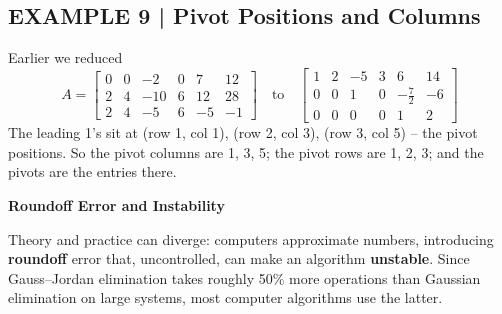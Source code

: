 \documentclass{article}
\newcommand{\redheading}[1]{{\vspace{2mm}\noindent\Large\bfseries\color{red!55!black} #1\par}\vspace{2mm}}
\theoremstyle{mystyle}
\begin{document}
\subsection*{EXAMPLE 9 | Pivot Positions and Columns}
Earlier we reduced
\[
A=\begin{bmatrix}0&0&-2&0&7&12\\2&4&-10&6&12&28\\2&4&-5&6&-5&-1\end{bmatrix}
\quad\text{to}\quad
\begin{bmatrix}1&2&-5&3&6&14\\0&0&1&0&-\tfrac72&-6\\0&0&0&0&1&2\end{bmatrix}
\]
The leading 1's sit at (row 1, col 1), (row 2, col 3), (row 3, col 5) -- the pivot positions. So the pivot columns are 1, 3, 5; the pivot rows are 1, 2, 3; and the pivots are the entries there.

\redheading{Roundoff Error and Instability}

Theory and practice can diverge: computers approximate numbers, introducing \textbf{roundoff} error that, uncontrolled, can make an algorithm \textbf{unstable}. Since Gauss--Jordan elimination takes roughly 50\% more operations than Gaussian elimination on large systems, most computer algorithms use the latter.
\end{document}
